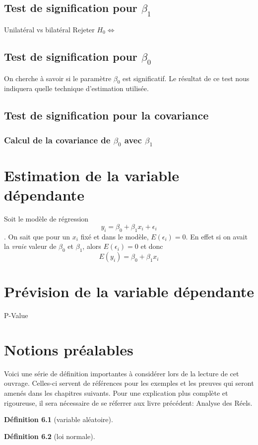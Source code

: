 \documentclass[12pt]{book}
\newcommand\todo[1]{\phantom{#1}}
\theoremstyle{definition}
\newtheorem{definition}{Définition}[section]
\begin{document}
\section{Test de signification pour $\beta_1$}
Unilatéral vs bilatéral
Rejeter $H_0 \iff $
\section{Test de signification pour $\beta_0$}
On cherche à savoir si le paramètre $\beta_0$ est significatif. Le résultat de ce test 
nous indiquera quelle technique d'estimation utilisée.
\section{Test de signification pour la covariance}
\subsection{Calcul de la covariance de $\beta_0$ avec $\beta_1$}
\chapter{Estimation de la variable dépendante}
Soit le modèle de régression \todo{Add link} $$y_i = \beta_0 + \beta_1x_i + \epsilon_i$$.
On sait que pour un $x_i$ fixé et dans le modèle, $E(\epsilon_i) = 0$. En effet si on avait 
la \textit{vraie} valeur de $\beta_0$ et $\beta_1$, alors $E(\epsilon_i) = 0$ et donc 
$$E(y_i) = \beta_0 + \beta_1x_i$$
\chapter{Prévision de la variable dépendante}
P-Value
\appendix
\chapter{Notions préalables}
Voici une série de définition importantes à considérer lors de la lecture de cet ouvrage. Celles-ci servent
de références pour les exemples et les preuves qui seront amenés dans les chapitres suivants. Pour une explication
plus complète et rigoureuse, il sera nécessaire de se réferrer aux livre précédent: Analyse des Réels.
\begin{definition}[variable aléatoire]
    \label{def:variable_aleatoire}
\end{definition}

\begin{definition}[loi normale]
    \label{def:loi_normale}
    
\end{definition}
\end{document}
